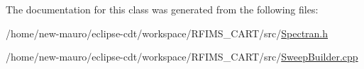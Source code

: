 The documentation for this class was generated from the following files\+:\begin{DoxyCompactItemize}
\item 
/home/new-\/mauro/eclipse-\/cdt/workspace/\+R\+F\+I\+M\+S\+\_\+\+C\+A\+R\+T/src/\hyperlink{Spectran_8h}{Spectran.\+h}\item 
/home/new-\/mauro/eclipse-\/cdt/workspace/\+R\+F\+I\+M\+S\+\_\+\+C\+A\+R\+T/src/\hyperlink{SweepBuilder_8cpp}{Sweep\+Builder.\+cpp}\end{DoxyCompactItemize}
